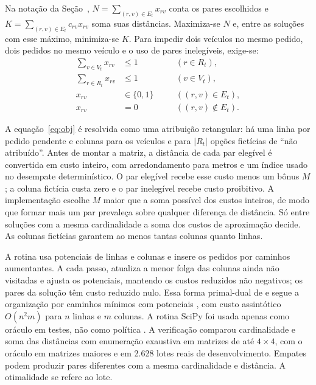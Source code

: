 

Na notação da Seção~, $N=\sum_{(r,v)\in E_t}x_{rv}$ conta os pares escolhidos e $K=\sum_{(r,v)\in E_t}c_{rv}x_{rv}$ soma suas distâncias. Maximiza-se $N$ e, entre as soluções com esse máximo, minimiza-se $K$. Para impedir dois veículos no mesmo pedido, dois pedidos no mesmo veículo e o uso de pares inelegíveis, exige-se:
\begin{equation}
\begin{aligned}
\sum_{v\in V_t}x_{rv}&\le1 &&\quad(r\in R_t),\\
\sum_{r\in R_t}x_{rv}&\le1 &&\quad(v\in V_t),\\
x_{rv}&\in\{0,1\} &&\quad((r,v)\in E_t),\\
x_{rv}&=0 &&\quad((r,v)\notin E_t).
\end{aligned}
\label{eq:rest}
\end{equation}

A equação~\ref{eq:obj} é resolvida como uma atribuição retangular: há uma linha por pedido pendente e colunas para os veículos e para $|R_t|$ opções fictícias de \enquote{não atribuído}. Antes de montar a matriz, a distância de cada par elegível é convertida em custo inteiro, com arredondamento para metros e um índice usado no desempate determinístico. O par elegível recebe esse custo menos um bônus $M$; a coluna fictícia custa zero e o par inelegível recebe custo proibitivo. A implementação escolhe $M$ maior que a soma possível dos custos inteiros, de modo que formar mais um par prevaleça sobre qualquer diferença de distância. Só entre soluções com a mesma cardinalidade a soma dos custos de aproximação decide. As colunas fictícias garantem ao menos tantas colunas quanto linhas.


A rotina usa potenciais de linhas e colunas e insere os pedidos por caminhos aumentantes. A cada passo, atualiza a menor folga das colunas ainda não visitadas e ajusta os potenciais, mantendo os custos reduzidos não negativos; os pares da solução têm custo reduzido nulo. Essa forma primal-dual de  e  segue a organização por caminhos mínimos com potenciais \cite{tomizawa1971, edmondskarp1972}, com custo assintótico $O(n^2m)$ para $n$ linhas e $m$ colunas. A rotina SciPy foi usada apenas como oráculo em testes, não como política \cite{jonker1987, crouse2016}. A verificação comparou cardinalidade e soma das distâncias com enumeração exaustiva em matrizes de até $4\times4$, com o oráculo em matrizes maiores e em 2.628 lotes reais de desenvolvimento. Empates podem produzir pares diferentes com a mesma cardinalidade e distância. A otimalidade se refere ao lote.



